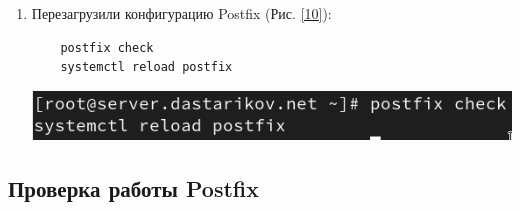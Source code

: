 \begin{enumerate}
\item Перезагрузили конфигурацию Postfix (Рис. \ref{10}):
  \begin{verbatim}
    postfix check
    systemctl reload postfix
  \end{verbatim}
\begin{center}
    \centering
    \includegraphics[width=\textwidth]{../images/image10.png}
    \label{10}
\end{center}

\end{enumerate}

\subsection{Проверка работы Postfix}
